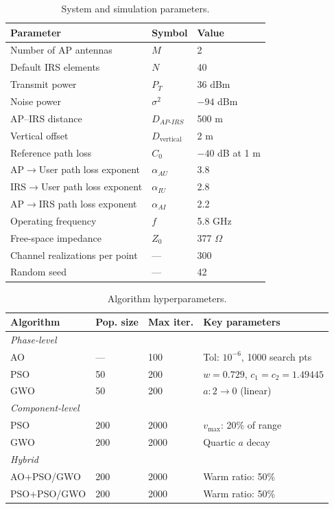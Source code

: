 \documentclass[12pt,a4paper]{article}
\begin{document}
\begin{table}[htbp]
    \centering
    \caption{System and simulation parameters.}
    \label{tab:system_params}
    \begin{tabular}{l l l}
        \toprule
        \textbf{Parameter} & \textbf{Symbol} & \textbf{Value} \\
        \midrule
        Number of AP antennas & $M$ & 2 \\
        Default IRS elements & $N$ & 40 \\
        Transmit power & $P_T$ & 36 dBm \\
        Noise power & $\sigma^2$ & $-94$ dBm \\
        AP--IRS distance & $D_{AP\text{-}IRS}$ & 500 m \\
        Vertical offset & $D_{\text{vertical}}$ & 2 m \\
        Reference path loss & $C_0$ & $-40$ dB at 1 m \\
        AP$\to$User path loss exponent & $\alpha_{AU}$ & 3.8 \\
        IRS$\to$User path loss exponent & $\alpha_{IU}$ & 2.8 \\
        AP$\to$IRS path loss exponent & $\alpha_{AI}$ & 2.2 \\
        Operating frequency & $f$ & 5.8 GHz \\
        Free-space impedance & $Z_0$ & 377 $\Omega$ \\
        Channel realizations per point & --- & 300 \\
        Random seed & --- & 42 \\
        \bottomrule
    \end{tabular}
\end{table}

\begin{table}[htbp]
    \centering
    \caption{Algorithm hyperparameters.}
    \label{tab:algo_params}
    \begin{tabular}{l l l l}
        \toprule
        \textbf{Algorithm} & \textbf{Pop. size} & \textbf{Max iter.} & \textbf{Key parameters} \\
        \midrule
        \multicolumn{4}{l}{\textit{Phase-level}} \\
        AO & --- & 100 & Tol: $10^{-6}$, 1000 search pts \\
        PSO & 50 & 200 & $w=0.729$, $c_1=c_2=1.49445$ \\
        GWO & 50 & 200 & $a: 2 \to 0$ (linear) \\
        \midrule
        \multicolumn{4}{l}{\textit{Component-level}} \\
        PSO & 200 & 2000 & $v_{\max}$: 20\% of range \\
        GWO & 200 & 2000 & Quartic $a$ decay \\
        \midrule
        \multicolumn{4}{l}{\textit{Hybrid}} \\
        AO+PSO/GWO & 200 & 2000 & Warm ratio: 50\% \\
        PSO+PSO/GWO & 200 & 2000 & Warm ratio: 50\% \\
        \bottomrule
    \end{tabular}
\end{table}
\end{document}
